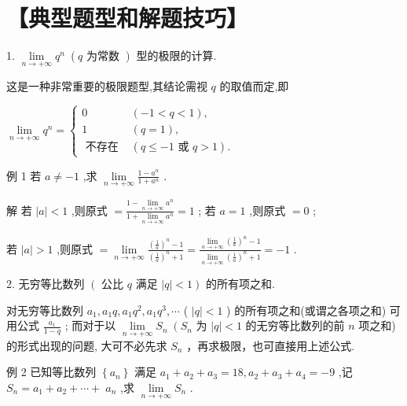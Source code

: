 \documentclass[10pt]{article}
\begin{document}
\section*{【典型题型和解题技巧】}

1. \(\mathop{\lim }\limits_{{n \rightarrow   + \infty }}{q}^{n}\;\left( {q\text{ 为常数 }}\right)\) 型的极限的计算.

这是一种非常重要的极限题型,其结论需视 \(q\) 的取值而定,即

\(\mathop{\lim }\limits_{{n \rightarrow   + \infty }}{q}^{n} = \left\{  \begin{array}{ll} 0 & \left( {-1 < q < 1}\right) , \\  1 & \left( {q = 1}\right) , \\  \text{ 不存在 } & \left( {q \leq   - 1\text{ 或 }q > 1}\right) . \end{array}\right.\)

例 1 若 \(a \neq   - 1\) ,求 \(\mathop{\lim }\limits_{{n \rightarrow   + \infty }}\frac{1 - {a}^{n}}{1 + {a}^{n}}\) .

解 若 \(\left| a\right|  < 1\) ,则原式 \(= \frac{1 - \mathop{\lim }\limits_{{n \rightarrow   + \infty }}{a}^{n}}{1 + \mathop{\lim }\limits_{{n \rightarrow   + \infty }}{a}^{n}} = 1\) ; 若 \(a = 1\) ,则原式 \(= 0\) ;

若 \(\left| a\right|  > 1\) ,则原式 \(= \mathop{\lim }\limits_{{n \rightarrow   + \infty }}\frac{{\left( \frac{1}{a}\right) }^{n} - 1}{{\left( \frac{1}{a}\right) }^{n} + 1} = \frac{\mathop{\lim }\limits_{{n \rightarrow   + \infty }}{\left( \frac{1}{a}\right) }^{n} - 1}{\mathop{\lim }\limits_{{n \rightarrow   + \infty }}{\left( \frac{1}{a}\right) }^{n} + 1} =  - 1\) .

2. 无穷等比数列 \(\left( \right.\) 公比 \(q\) 满足 \(\left. {\left| q\right|  < 1}\right)\) 的所有项之和.

对无穷等比数列 \({a}_{1},{a}_{1}q,{a}_{1}{q}^{2},{a}_{1}{q}^{3},\cdots\) ( \(\left| q\right|  < 1\) ) 的所有项之和(或谓之各项之和) 可用公式 \(\frac{{a}_{1}}{1 - q}\) ; 而对于以 \(\mathop{\lim }\limits_{{n \rightarrow   + \infty }}{S}_{n}\;\left( {S}_{n}\right.\) 为 \(\left| q\right|  < 1\) 的无穷等比数列的前 \(n\) 项之和)的形式出现的问题, 大可不必先求 \({S}_{n}\) ，再求极限，也可直接用上述公式.

例 2 已知等比数列 \(\left\{  {a}_{n}\right\}\) 满足 \({a}_{1} + {a}_{2} + {a}_{3} = {18},{a}_{2} + {a}_{3} + {a}_{4} =  - 9\) ,记 \({S}_{n} = {a}_{1} + {a}_{2} + \cdots  + \; {a}_{n}\) ,求 \(\mathop{\lim }\limits_{{n \rightarrow   + \infty }}{S}_{n}\) .
\end{document}
